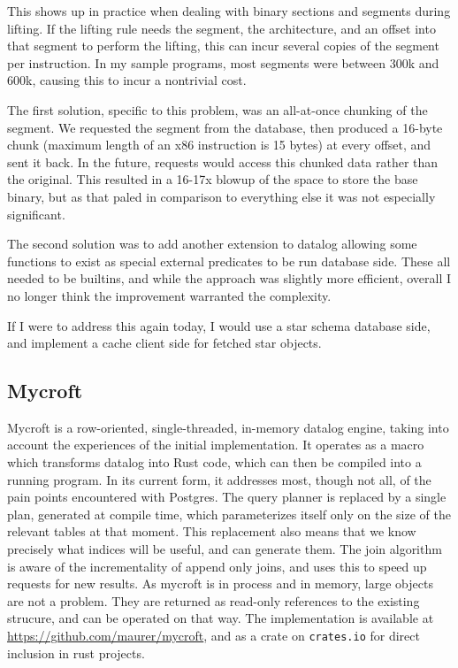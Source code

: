 This shows up in practice when dealing with binary sections and segments during lifting.
If the lifting rule needs the segment, the architecture, and an offset into that segment to perform the lifting, this can incur several copies of the segment per instruction.
In my sample programs, most segments were between 300k and 600k, causing this to incur a nontrivial cost.

The first solution, specific to this problem, was an all-at-once chunking of the segment.
We requested the segment from the database, then produced a 16-byte chunk (maximum length of an x86 instruction is 15 bytes) at every offset, and sent it back.
In the future, requests would access this chunked data rather than the original.
This resulted in a 16-17x blowup of the space to store the base binary, but as that paled in comparison to everything else it was not especially significant.

The second solution was to add another extension to datalog allowing some functions to exist as special external predicates to be run database side.
These all needed to be builtins, and while the approach was slightly more efficient, overall I no longer think the improvement warranted the complexity.

If I were to address this again today, I would use a star schema database side, and implement a cache client side for fetched star objects.

\subsection{Mycroft}
\label{sec:mycroft}
Mycroft is a row-oriented, single-threaded, in-memory datalog engine, taking into account the experiences of the initial implementation.
It operates as a macro which transforms datalog into Rust code, which can then be compiled into a running program.
In its current form, it addresses most, though not all, of the pain points encountered with Postgres.
The query planner is replaced by a single plan, generated at compile time, which parameterizes itself only on the size of the relevant tables at that moment.
This replacement also means that we know precisely what indices will be useful, and can generate them.
The join algorithm is aware of the incrementality of append only joins, and uses this to speed up requests for new results. 
As mycroft is in process and in memory, large objects are not a problem.
They are returned as read-only references to the existing strucure, and can be operated on that way.
The implementation is available at \url{https://github.com/maurer/mycroft}, and as a crate on \texttt{crates.io} for direct inclusion in rust projects.

